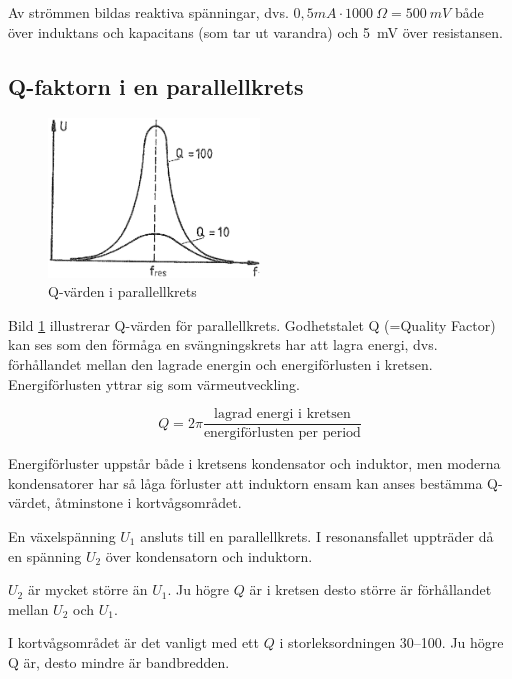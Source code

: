 Av strömmen bildas reaktiva spänningar, dvs.
\(0,5 mA \cdot 1000\ \Omega = 500\ mV\) både över induktans och kapacitans
(som tar ut varandra) och 5~mV över resistansen.

\subsection{Q-faktorn i en parallellkrets}
\label{Q-faktor}

\begin{figure}
\includegraphics[width=0.5\textwidth]{images/cropped_pdfs/bild_2_3-20.pdf}
\caption{Q-värden i parallellkrets}
\label{fig:BildII3-20}
\end{figure}

Bild \ref{fig:BildII3-20} illustrerar Q-värden för parallellkrets.
Godhetstalet Q (=Quality Factor) kan ses som den förmåga en svängningskrets har
att lagra energi, dvs. förhållandet mellan den lagrade energin och
energiförlusten i kretsen.
Energiförlusten yttrar sig som värmeutveckling.

\[
Q = 2\pi \frac{\text{lagrad energi i kretsen}}{\text{energiförlusten per period}}
\]

Energiförluster uppstår både i kretsens kondensator och induktor, men moderna
kondensatorer har så låga förluster att induktorn ensam kan anses bestämma
Q-värdet, åtminstone i kortvågsområdet.

En växelspänning \(U_1\) ansluts till en parallellkrets.
I resonansfallet uppträder då en spänning \(U_2\) över kondensatorn och
induktorn.

\(U_2\) är mycket större än \(U_1\).
Ju högre \(Q\) är i kretsen desto större är förhållandet mellan \(U_2\) och
\(U_1\).

I kortvågsområdet är det vanligt med ett \(Q\) i storleksordningen 30--100.
Ju högre Q är, desto mindre är bandbredden.

